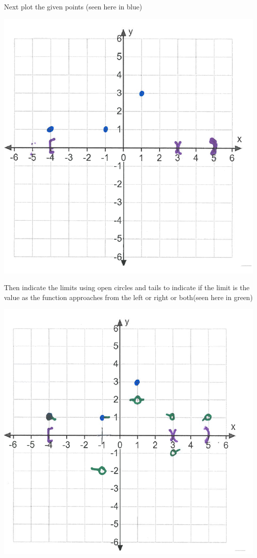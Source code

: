 \documentclass[nooutcomes,handout]{ximera}
\begin{document}
\begin{problem}
\begin{freeResponse}
	Next plot the given points (seen here in blue)
	    \begin{image}
		\includegraphics[scale=.5]{"Sketching stage 2"}
  	  \end{image}
	
	Then indicate the limits using open circles and tails to indicate if the limit is the value as the function approaches from the left or right or both(seen here in green)
	    \begin{image}
	\includegraphics[scale=.5]{"Sketching stage 3"}
	    \end{image}


\end{freeResponse}
\end{problem}
\end{document}
